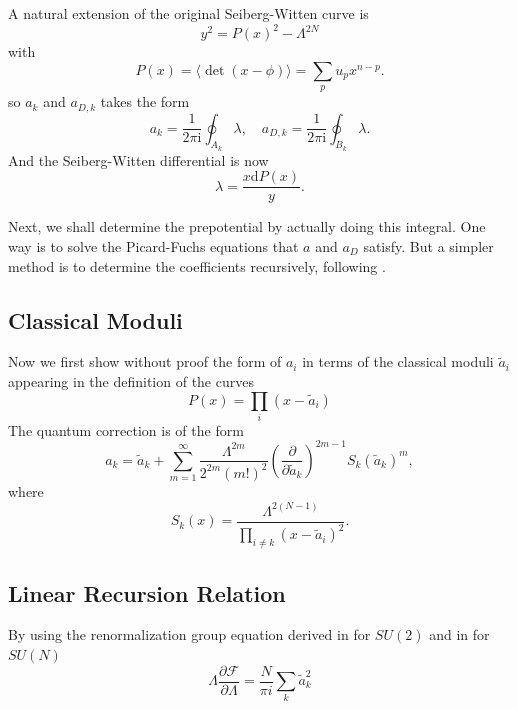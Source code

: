 \documentclass{article}
\begin{document}
A natural extension of the original Seiberg-Witten curve is
\begin{equation}
    y^2=P(x)^2-\Lambda^{2N}
\end{equation}
with
\begin{equation}
    P(x)=\langle\operatorname{det}(x-\phi)\rangle=\sum_p u_{p} x^{n-p}.
\end{equation}
so $a_k$ and $a_{D,k}$ takes the form
\begin{equation}
    a_k=\frac{1}{2\pi\mathrm{i}}\oint_{A_k}\lambda,\quad a_{D,k}=\frac{1}{2\pi\mathrm{i}}\oint_{B_k}\lambda.
\end{equation}
And the Seiberg-Witten differential is now
\begin{equation}
   \lambda=\frac{x\mathrm{d}P(x)}{y}.
\end{equation}

Next, we shall determine the prepotential by actually doing this integral. One way is to solve the Picard-Fuchs equations that $a$ and $a_D$ satisfy. But a simpler method is to determine the coefficients recursively, following \cite{Chan:1999gj,DHoker:1996pva}.

\subsection{Classical Moduli}
Now we first show without proof the form of $a_i$ in terms of the classical moduli $\tilde{a}_i$ appearing in the definition of the curves
\begin{equation}
    P(x)=\prod_i (x-\tilde{a}_i)
\end{equation}
The quantum correction is of the form
\begin{equation}
\label{eq:classical}
   a_{k}=\tilde{a}_{k}+\sum_{m=1}^{\infty} \frac{\Lambda^{2 m}}{2^{2 m}(m !)^{2}}\left(\frac{\partial}{\partial \tilde{a}_{k}}\right)^{2 m-1} S_{k}\left(\tilde{a}_{k}\right)^{m}, 
\end{equation}
where
\begin{equation}
   S_{k}(x)=\frac{\Lambda^{2(N-1)}}{\prod_{i \neq k}\left(x-\tilde{a}_{i}\right)^{2}} . 
\end{equation}

\subsection{Linear Recursion Relation}
By using the renormalization group equation derived in \cite{Matone:1995rx} for $SU(2)$ and in \cite{Eguchi:1995jh,Sonnenschein:1995hv} for $SU(N)$
\begin{equation}
\label{eq:RGEN}
\Lambda \frac{\partial \mathscr{F}}{\partial \Lambda}=\frac{N}{\pi i} \sum_k \tilde{a}_{k}^{2}
\end{equation}
\end{document}

